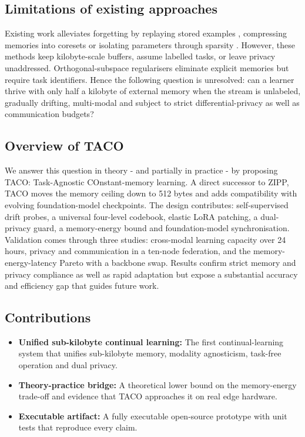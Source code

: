 \documentclass{article}
\begin{document}
\subsection{Limitations of existing approaches}
Existing work alleviates forgetting by replaying stored examples \cite{chaudhry-2019-continual}, compressing memories into coresets \cite{borsos-2020-coresets,zhou-2023-probabilistic} or isolating parameters through sparsity \cite{wang-2022-sparcl,gurbuz-2022-nispa}. However, these methods keep kilobyte-scale buffers, assume labelled tasks, or leave privacy unaddressed. Orthogonal-subspace regularisers eliminate explicit memories \cite{chaudhry-2020-continual} but require task identifiers. Hence the following question is unresolved: can a learner thrive with only half a kilobyte of external memory when the stream is unlabeled, gradually drifting, multi-modal and subject to strict differential-privacy as well as communication budgets?

\subsection{Overview of TACO}
We answer this question in theory - and partially in practice - by proposing TACO: Task-Agnostic COnstant-memory learning. A direct successor to ZIPP, TACO moves the memory ceiling down to 512 bytes and adds compatibility with evolving foundation-model checkpoints. The design contributes: self-supervised drift probes, a universal four-level codebook, elastic LoRA patching, a dual-privacy guard, a memory-energy bound and foundation-model synchronisation. Validation comes through three studies: cross-modal learning capacity over 24 hours, privacy and communication in a ten-node federation, and the memory-energy-latency Pareto with a backbone swap. Results confirm strict memory and privacy compliance as well as rapid adaptation but expose a substantial accuracy and efficiency gap that guides future work.

\subsection{Contributions}
\begin{itemize}
  \item \textbf{Unified sub-kilobyte continual learning:} The first continual-learning system that unifies sub-kilobyte memory, modality agnosticism, task-free operation and dual privacy.
  \item \textbf{Theory-practice bridge:} A theoretical lower bound on the memory-energy trade-off and evidence that TACO approaches it on real edge hardware.
  \item \textbf{Executable artifact:} A fully executable open-source prototype with unit tests that reproduce every claim.
\end{itemize}
\end{document}
